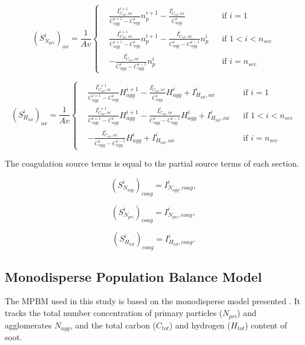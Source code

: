 \begin{equation}
	\left(S^i_{N_{pri}}\right)_{ox}=
	\frac{1}{Av}
	\left\{
	\begin{aligned}
		&\frac{I^{i+1}_{C_{tot},ox}}{C^{i+1}_{agg}-C^{i}_{agg}}n^{i+1}_p
		-
		\frac{I^{i}_{C_{tot},ox}}{C^{i}_{agg}}
		&&
		\text{if } i = 1
		\\
		&\frac{I^{i+1}_{C_{tot},ox}}{C^{i+1}_{agg}-C^{i}_{agg}}n^{i+1}_p
		-
		\frac{I^{i}_{C_{tot},ox}}{C^{i}_{agg}-C^{i-1}_{agg}}n^{i}_p
		&&
		\text{if } 1 < i < n_{sec}
		\\
		&
		-
		\frac{I^{i}_{C_{tot},ox}}{C^{i}_{agg}-C^{i-1}_{agg}}n^{i}_p
		&&\text{if } i=n_{sec}
	\end{aligned}
	\right.
	\label{eqn:S_Npri_oxsect}
\end{equation}

\begin{equation}
	\left(S^i_{H_{tot}}\right)_{ox}=
	\frac{1}{Av}
	\left\{
	\begin{aligned}
		&\frac{I^{i+1}_{C_{tot},ox}}{C^{i+1}_{agg}-C^{i}_{agg}}H^{i+1}_{agg}
		-
		\frac{I^{i}_{C_{tot},ox}}{C^{i}_{agg}}H^{i}_{agg}
		+ I^{i}_{H_{tot}, ox}
		&&
		\text{if } i = 1
		\\
		&\frac{I^{i+1}_{C_{tot},ox}}{C^{i+1}_{agg}-C^{i}_{agg}}H^{i+1}_{agg}
		-
		\frac{I^{i}_{C_{tot},ox}}{C^{i}_{agg}-C^{i-1}_{agg}}H^{i}_{agg}
		+ I^{i}_{H_{tot}, ox}
		&&
		\text{if } 1 < i < n_{sec}
		\\
		&
		-
		\frac{I^{i}_{C_{tot},ox}}{C^{i}_{agg}-C^{i-1}_{agg}}H^{i}_{agg}
		+ I^{i}_{H_{tot}, ox}
		&&\text{if } i=n_{sec}
	\end{aligned}
	\right.
	\label{eqn:S_Htot_oxsect}
\end{equation}

The coagulation source terms is equal to the partial source terms of each section.

\begin{equation}
	\left(S^i_{N_{agg}}\right)_{coag}= I^i_{N_{agg},coag},
\end{equation}

\begin{equation}
	\left(S^i_{N_{pri}}\right)_{coag}= I^i_{N_{pri},coag},
\end{equation}

\begin{equation}
	\left(S^i_{H_{tot}}\right)_{coag}= I^i_{H_{tot},coag}.
\end{equation}

\subsection{Monodisperse Population Balance Model}
\label{sec:mpbm}
The MPBM used in this study is based on the monodisperse model presented \citep{kholghy2021surface}. It tracks the total number concentration of primary particles ($N_{pri}$) and agglomerates $N_{agg}$, and the total carbon ($C_{tot}$) and hydrogen ($H_{tot}$) content of soot.


